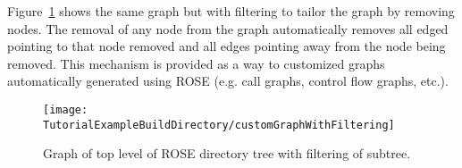 Figure~\ref{tutorial:exampleCustomGraphWithFiltering} shows the same graph
but with filtering to tailor the graph by removing nodes.  The removal of any
node from the graph automatically removes all edged pointing to that node removed
and all edges pointing away from the node being removed.  This mechanism is
provided as a way to customized graphs automatically generated using ROSE
(e.g. call graphs, control flow graphs, etc.).

\begin{figure}[!h]
\texttt{[image: \\TutorialExampleBuildDirectory/customGraphWithFiltering]}
\caption{Graph of top level of ROSE directory tree with filtering of subtree.}
\label{tutorial:exampleCustomGraphWithFiltering}
\end{figure}

